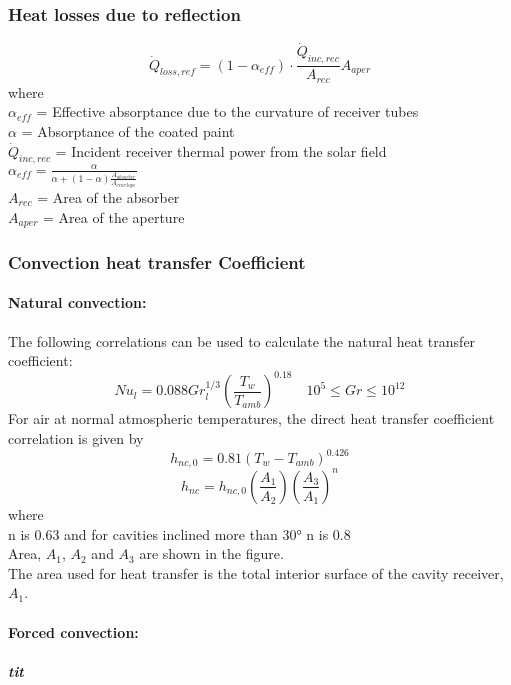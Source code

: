 \subsubsection{Heat losses due to reflection }
\begin{equation}
\dot Q_{loss,ref}=(1-\alpha_{eff})\cdot \frac{\dot Q_{inc,rec}}{A_{rec}} A_{aper}
\end{equation}
where\\
$\alpha_{eff}$ = Effective absorptance due to the curvature of receiver tubes\\
$\alpha$ = Absorptance of the coated paint\\
$\dot Q_{inc,rec}$ = Incident receiver thermal power from the solar field\\
$ \alpha_{eff} = \frac {\alpha} {\alpha+(1-\alpha)\frac{A_{absorber}}{A_{envelope}}}$\\
$A_{rec}$ = Area of the absorber \\
$A_{aper}$ = Area of the aperture \\
\subsubsection{Convection heat transfer Coefficient }
\paragraph{Natural convection:}
The following correlations can be used to calculate the natural heat transfer coefficient:
\begin{equation}
Nu_l = 0.088Gr_l^{1/3} \left(\frac{T_w}{T_{amb}}\right)^{0.18} \quad  10^5 \le Gr \le 10^{12}
\end{equation}
For air at normal atmospheric temperatures, the direct heat transfer coefficient correlation is given by 
\begin{equation}
h_{nc,0} = 0.81(T_w - T_{amb})^{0.426}
\end{equation}
\begin{equation}
h_{nc} = h_{nc,0} \left(\frac{A_1}{A_2}\right) \left(\frac{A_3}{A_1}\right)^n
\end{equation}
where\\
n is 0.63 and for cavities inclined more than 30° n is 0.8\\
Area, $A_1$, $A_2$ and $A_3$ are shown in the figure. \\
The area used for heat transfer is the total interior surface of the cavity receiver, $A_1$. \\
\paragraph{Forced convection:}
\subparagraph{tit}
